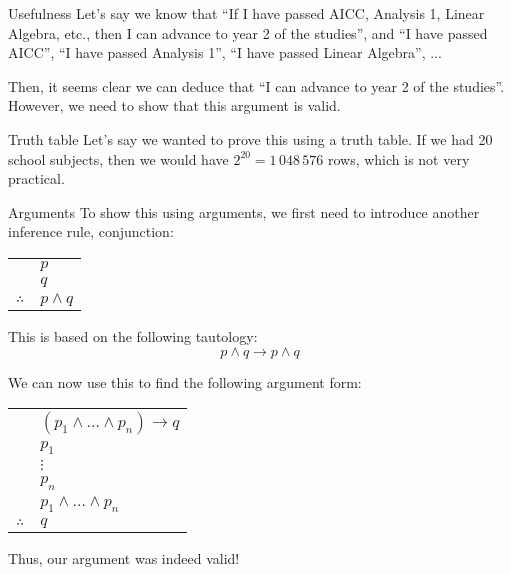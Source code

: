\documentclass{article}
\begin{document}
\begin{parag}{Usefulness}
    Let's say we know that ``If I have passed AICC, Analysis 1, Linear Algebra, etc., then I can advance to year 2 of the studies'', and ``I have passed AICC'', ``I have passed Analysis 1'', ``I have passed Linear Algebra'', ... 

    Then, it seems clear we can deduce that ``I can advance to year 2 of the studies''. However, we need to show that this argument is valid.

    \begin{subparag}{Truth table}
        Let's say we wanted to prove this using a truth table. If we had 20 school subjects, then we would have $2^{20} = 1\,048\,576$ rows, which is not very practical. 
    \end{subparag}

    \begin{subparag}{Arguments}
        To show this using arguments, we first need to introduce another inference rule, conjunction: 
        \begin{center}
        \begin{tabular}{rl}
            & $p$  \\
            & $q$  \\
            \hline
            $\therefore$ & $p \land q$
        \end{tabular}
        \end{center}
        
        This is based on the following tautology: 
        \[p \land q \to p \land q\]

        We can now use this to find the following argument form:
        \begin{center}
        \begin{tabular}{rl}
            & $\left(p_1 \land \ldots \land p_n\right) \to q$ \\
            & $p_1$   \\
            & $\vdots$ \\
            & $p_n$  \\
            & $p_1 \land \ldots \land p_n$ \\
            \hline
            $\therefore$ & $q$
        \end{tabular}
        \end{center}
        
        Thus, our argument was indeed valid!
    \end{subparag}
\end{parag}
\end{document}
